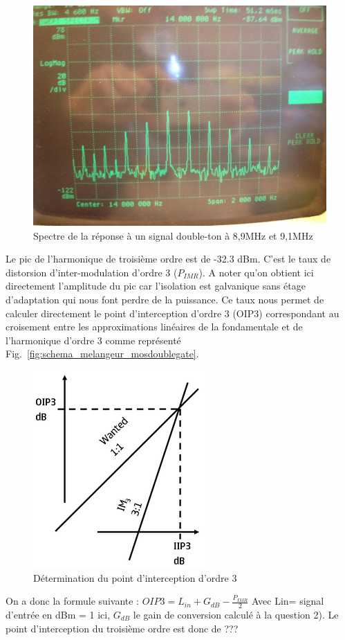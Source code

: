 \documentclass{article}
\begin{document}
\begin{figure}[h!]
	\centering
	\includegraphics[width=.7\textwidth]{9_3_4}
	\caption{Spectre de la réponse à un signal double-ton à 8,9MHz et 9,1MHz}
	\label{fig:9_3_4}
\end{figure}
Le pic de l'harmonique de troisième ordre est de -32.3 dBm. C'est le taux de distorsion d'inter-modulation d'ordre 3 ($P_{IMR}$). A noter qu'on obtient ici directement l'amplitude du pic car l'isolation est galvanique sans étage d'adaptation qui nous font perdre de la puissance.
Ce taux nous permet de calculer directement le point d'interception d'ordre 3 (OIP3) correspondant au croisement entre les approximations linéaires de la fondamentale et de l'harmonique d'ordre 3 comme représenté Fig.~\ref{fig:schema_melangeur_mosdoublegate}.

\begin{figure}[h!]
	\centering
	\includegraphics[width=.3\textwidth]{OIP3}
	\caption{Détermination du point d'interception d'ordre 3}
	\label{fig:OIP3}
\end{figure}

On a donc la formule suivante : $OIP3=L_{in}+G_{dB}-\frac{P_{IMR}}{2}$
Avec Lin= signal d'entrée en dBm = 1 ici, $G_{dB}$ le gain de conversion calculé à la question 2).
%
Le point d'interception du troisième ordre est donc de ???
 
\end{document}
